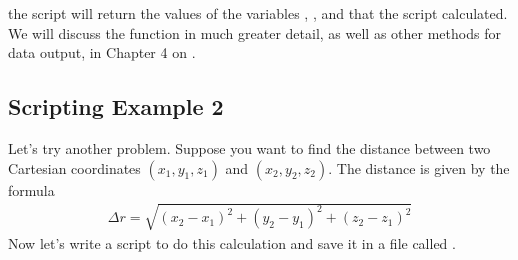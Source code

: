 \documentclass[letterpaper,10pt,english]{sphinxmanual}
\begin{document}
\sphinxAtStartPar
the script will return the values of the variables , , and  that the script calculated.  We will discuss the  function in much greater detail, as well as other methods for data output, in Chapter 4 on {\hyperref[\detokenize{chap4/chap4_io:chap4}]{}}.


\subsection{Scripting Example 2}
\label{\detokenize{chap2/chap2_basics:scripting-example-2}}\label{\detokenize{chap2/chap2_basics:chap2-scriptexmp2}}
\sphinxAtStartPar
Let’s try another problem.  Suppose you want to find the distance between two Cartesian coordinates \((x_1, y_1, z_1)\) and \((x_2, y_2, z_2)\).  The distance is given by the formula
\begin{equation*}
\begin{split}\Delta r = \sqrt{(x_2-x_1)^2+(y_2-y_1)^2+(z_2-z_1)^2}\end{split}
\end{equation*}
\sphinxAtStartPar
Now let’s write a script to do this calculation and save it in a file called .

\begin{sphinxVerbatim}[commandchars=\\\{\},numbers=left,firstnumber=1,stepnumber=1]
   

      
      

        
\end{sphinxVerbatim}
\end{document}

